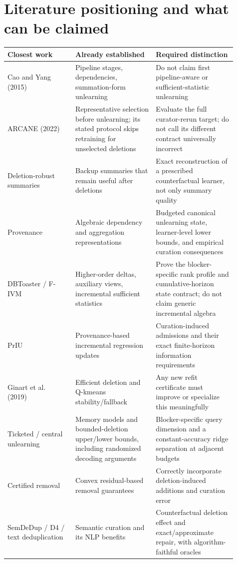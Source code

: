 \documentclass[11pt,a4paper]{article}
\theoremstyle{definition}\newtheorem{definition}[theorem]{Definition}
\begin{document}
\section{Literature positioning and what can be claimed}
\begin{longtable}{p{0.27\linewidth}p{0.32\linewidth}p{0.32\linewidth}}
\toprule
Closest work & Already established & Required distinction\\\midrule\endhead
Cao and Yang (2015)~\cite{cao2015} & Pipeline stages, dependencies, summation-form unlearning & Do not claim first pipeline-aware or sufficient-statistic unlearning\\[4pt]
ARCANE (2022)~\cite{arcane} & Representative selection before unlearning; its stated protocol skips retraining for unselected deletions & Evaluate the full curator-rerun target; do not call its different contract universally incorrect\\[4pt]
Deletion-robust summaries~\cite{mirzasoleiman2017,kazemi2018} & Backup summaries that remain useful after deletions & Exact reconstruction of a prescribed counterfactual learner, not only summary quality\\[4pt]
Provenance~\cite{green2007,amsterdamer2011} & Algebraic dependency and aggregation representations & Budgeted canonical unlearning state, learner-level lower bounds, and empirical curation consequences\\[4pt]
DBToaster / F-IVM~\cite{dbtoaster2012,fivm2023} & Higher-order deltas, auxiliary views, incremental sufficient statistics & Prove the blocker-specific rank profile and cumulative-horizon state contract; do not claim generic incremental algebra\\[4pt]
PrIU~\cite{priu2020} & Provenance-based incremental regression updates & Curation-induced admissions and their exact finite-horizon information requirements\\[4pt]
Ginart et al. (2019)~\cite{ginart2019} & Efficient deletion and Q-kmeans stability/fallback & Any new refit certificate must improve or specialize this meaningfully\\[4pt]
Ticketed / central unlearning~\cite{ghazi2023,cherapanamjeri2025} & Memory models and bounded-deletion upper/lower bounds, including randomized decoding arguments & Blocker-specific query dimension and a constant-accuracy ridge separation at adjacent budgets\\[4pt]
Certified removal~\cite{guo2020} & Convex residual-based removal guarantees & Correctly incorporate deletion-induced additions and curation error\\[4pt]
SemDeDup / D4 / text deduplication~\cite{semdedup,d4,lee2022} & Semantic curation and its NLP benefits & Counterfactual deletion effect and exact/approximate repair, with algorithm-faithful oracles\\
\bottomrule
\end{longtable}
\end{document}
